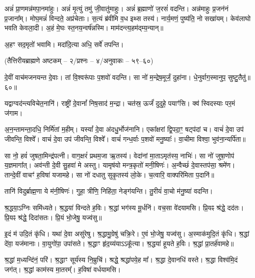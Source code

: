 अन्नं॑ प्रा॒णमन्न॑मपा॒नमा॑हुः।
अन्नं॑ मृ॒त्युं तमु॑ जी॒वातु॑माहुः।
अन्नं॑ ब्र॒ह्माणो॑ ज॒रसं॑  वदन्ति।
अन्न॑माहुः प्र॒जन॑नं प्र॒जाना᳚म्।
मोघ॒मन्नं॑ विन्दते॒ अप्र॑चेताः।
स॒त्यं ब्र॑वीमि व॒ध इथ्स तस्य॑।
नार्य॒मणं॒ पुष्य॑ति॒ नो सखा॑यम्।
केव॑लाघो भवति केवला॒दी।
अ॒हं मे॒घः स्त॒नय॒न्वर्\mbox{}ष॑न्नस्मि।
माम॑दन्त्य॒हम॑द्म्य॒न्यान्॥

अ॒हꣳ सद॒मृतो॑ भवामि।
मदा॑दि॒त्या अधि॒ सर्वे॑ तपन्ति।

\centerline{\scriptsize (तैत्तिरीयब्राह्मणे अष्टकम् – २/प्रश्नः – ४/अनुवाकः – ५९–६०)}

दे॒वीं वाच॑मजनयन्त दे॒वाः।
तां वि॒श्वरू॑पाः प॒शवो॑ वदन्ति।
सा नो॑ म॒न्द्रेष॒मूर्जं॒ दुहा॑ना।
धे॒नुर्वाग॒स्मानुप॒ सुष्टु॒तैतु॑॥६०॥


यद्वाग्वद॑न्त्यविचेत॒नानि॑।
राष्ट्री॑ दे॒वानां᳚ निष॒साद॑ म॒न्द्रा।
चत॑स्र॒ ऊर्जं॑ दुदुहे॒ पयाꣳ॑सि।
क्व॑ स्विदस्याः पर॒मं ज॑गाम।

\closesection

अ॒न॒न्तामन्ता॒दधि॒ निर्मि॑तां म॒हीम्।
यस्यां᳚ दे॒वा अ॑दधु॒र्भोज॑नानि।
एका᳚क्षरां द्वि॒पदा॒ꣳ॒ षट्प॑दां च।
वाचं॑ दे॒वा उप॑ जीवन्ति॒ विश्वे᳚।
वाचं॑ दे॒वा उप॑ जीवन्ति॒ विश्वे᳚।
वाचं॑ गन्ध॒र्वाः प॒शवो॑ मनु॒ष्याः᳚।
वा॒चीमा विश्वा॒ भुव॑ना॒न्यर्पि॑ता॥

सा नो॒ हवं॑ जुषता॒मिन्द्र॑पत्नी।
वाग॒क्षरं॑ प्रथम॒जा ऋ॒तस्य॑।
वेदा॑नां मा॒ताऽमृत॑स्य॒ नाभिः॑।
सा नो॑ जुषा॒णोप॑ य॒ज्ञमागा᳚त्।
अव॑न्ती दे॒वी सु॒हवा॑ मे अस्तु।
यामृष॑यो मन्त्र॒कृतो॑ मनी॒षिणः॑।
अ॒न्वैच्छं॑ दे॒वास्तप॑सा॒ श्रमे॑ण।
तान्दे॒वीं वाचꣳ॑ ह॒विषा॑ यजामहे।
सा नो॑ दधातु सुकृ॒तस्य॑ लो॒के।
च॒त्वारि॒ वाक्परि॑मिता प॒दानि॑॥

तानि॑ विदुर्ब्राह्म॒णा ये म॑नी॒षिणः॑।
गुहा॒ त्रीणि॒ निहि॑ता॒ नेङ्ग॑यन्ति।
तु॒रीयं॑ वा॒चो म॑नु॒ष्या॑ वदन्ति।


श्र॒द्धया॒ऽग्निः समि॑ध्यते।
श्र॒द्धया॑ विन्दते ह॒विः।
श्र॒द्धां भग॑स्य मू॒र्धनि॑।
वच॒सा वे॑दयामसि।
प्रि॒यꣴ श्र॑द्धे॒ दद॑तः।
प्रि॒यꣴ श्र॑द्धे॒ दिदा॑सतः।
प्रि॒यं भो॒जेषु॒ यज्व॑सु॥

इ॒दं म॑ उदि॒तं कृ॑धि।
यथा॑ दे॒वा असु॑रेषु।
श्र॒द्धामु॒ग्रेषु॑ चक्रि॒रे।
ए॒वं भो॒जेषु॒ यज्व॑सु।
अ॒स्माक॑मुदि॒तं कृ॑धि।
श्र॒द्धां दे॑वा॒ यज॑मानाः।
वा॒युगो॑पा॒ उपा॑सते।
श्र॒द्धाꣳ हृ॑द॒य्य॑याऽऽकू᳚त्या।
श्र॒द्धया॑ हूयते ह॒विः।
श्र॒द्धां प्रा॒तर्\mbox{}ह॑वामहे॥

श्र॒द्धां म॒ध्यन्दि॑नं॒ परि॑।
श्र॒द्धाꣳ सूर्य॑स्य नि॒म्रुचि॑।
श्रद्धे॒ श्रद्धा॑पये॒ह मा᳚।
श्र॒द्धा दे॒वानधि॑ वस्ते।
श्र॒द्धा विश्व॑मि॒दं जग॑त्।
श्र॒द्धां काम॑स्य मा॒तरम्᳚।
ह॒विषा॑ वर्धयामसि।

